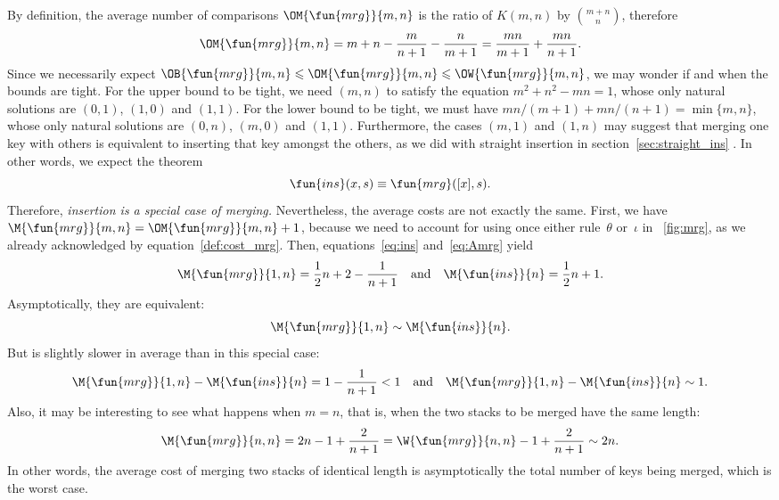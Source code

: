By definition, the average number of comparisons
\(\OM{\fun{mrg}}{m,n}\) is the ratio
of \(K(m,n)\) by \(\binom{m+n}{n}\), therefore
\begin{equation}
\OM{\fun{mrg}}{m,n} = m + n - \frac{m}{n+1} - \frac{n}{m+1}
  = \frac{mn}{m+1} + \frac{mn}{n+1}.
\label{eq:Amrg}
\end{equation}
Since we necessarily expect \(\OB{\fun{mrg}}{m,n} \leqslant
\OM{\fun{mrg}}{m,n} \leqslant \OW{\fun{mrg}}{m,n}\), we may wonder if
and when the bounds are tight. For the upper bound to be tight, we
need \((m,n)\) to satisfy the equation \(m^2 + n^2 - mn = 1\), whose
only natural solutions are \((0,1)\), \((1,0)\) and \((1,1)\). For the
lower bound to be tight, we must have \(mn/(m+1) + mn/(n+1) =
\min\{m,n\}\), whose only natural solutions are \((0,n)\), \((m,0)\)
and \((1,1)\). Furthermore, the cases \((m,1)\) and \((1,n)\) may
suggest that merging one key with others is equivalent to inserting
that key amongst the others, as we did with straight insertion in
section~\ref{sec:straight_ins} . In other
words, we expect the theorem
\begin{equation}
\fun{ins}(x,s) \equiv \fun{mrg}([x],s).
\label{eq:ins_mrg}
\index{ins@\fun{ins/2}}\index{mrg@\fun{mrg/2}}
\end{equation}
Therefore, \emph{insertion is a special case of merging.}
Nevertheless, the average costs are not exactly the same. First, we
have \(\M{\fun{mrg}}{m,n} = \OM{\fun{mrg}}{m,n} + 1\), because we need
to account for using once either rule~\(\theta\) or~\(\iota\) in
\fig~\vref{fig:mrg}, as we already acknowledged by
equation~\eqref{def:cost_mrg}. Then, equations~\eqref{eq:ins}
 and~\eqref{eq:Amrg} yield
\begin{equation*}
\M{\fun{mrg}}{1,n} = \frac{1}{2}{n} + 2 - \frac{1}{n+1}
\quad\text{and}\quad
\M{\fun{ins}}{n} = \frac{1}{2}{n} + 1.
\index{ins@$\M{\fun{ins}}{n}$}\index{mrg@$\M{\fun{mrg}}{1,n}$}
\end{equation*}
Asymptotically, they are equivalent:
\begin{equation*}
\M{\fun{mrg}}{1,n} \sim \M{\fun{ins}}{n}.
\end{equation*}
But  is slightly slower in average
than  in this special case:
\begin{equation*}
\M{\fun{mrg}}{1,n} - \M{\fun{ins}}{n} = 1 - \frac{1}{n+1} < 1
\quad\text{and}\quad
\M{\fun{mrg}}{1,n} - \M{\fun{ins}}{n} \sim 1.
\end{equation*}
Also, it may be interesting to see what happens when \(m=n\), that is,
when the two stacks to be merged have the same length:
\begin{equation}
\M{\fun{mrg}}{n,n} = 2n - 1 + \frac{2}{n+1} = \W{\fun{mrg}}{n,n} - 1 +
\frac{2}{n+1} \sim 2n.\index{mrg@$\M{\fun{mrg}}{n,n}$}
\label{eq:Amrg_n_n}
\end{equation}
In other words, the average cost of merging two stacks of identical
length is asymptotically the total number of keys being merged, which
is the worst case.

